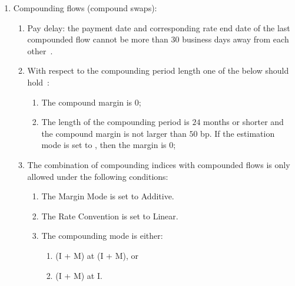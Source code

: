 \documentclass[]{pmv_report} %
\begin{document}
\begin{enumerate}
\begin{enumerate}
              For pricing-purposes the mean type `built on a weighting schedule’ is allowed to be used, provided the difference between the schedule period lengths of the weighting schedule and the fixing schedule used in the average index for the curve calibration is no more than 10 calendar days.
              This limitation is imposed to bound the error due to neglecting convexity adjustments.
          \item The approximation methods (the first order  and the second order) for the average rates are not requested and as such are not signed off~\cite{MxSettings.StaticData-RateIndex}.
          \item Murex does not recommend to use \textit{Rate conversion} in combination with Average index (see Murex documentation~\cite{Mx.RateIndex})~\cite{MxSettings.IRS,MxSettings.IRSGenerator}.
      \end{enumerate}
  \item Compounding flows (compound swaps):
  \begin{enumerate}
    \item Pay delay: the payment date and corresponding rate end date of the last compounded flow cannot be more than 30 business days away from each other~\cite{MxSettings.IRS}.
    \item With respect to the compounding period length one of the below should hold~\cite{MxSettings.IRS}:
    \begin{enumerate}
      \item The compound margin is $0$;
      \item The length of the compounding period is $24$ months or shorter and the compound margin is not larger than $50$ bp.
            If the estimation mode is set to , then the margin is $0$;
    \end{enumerate}
    \item The combination of compounding indices with compounded flows is only allowed under the following conditions:
    \begin{enumerate}
      \item The Margin Mode is set to Additive.
      \item The Rate Convention is set to Linear.
      \item The compounding mode is either:
        \begin{enumerate}
          \item (I + M) at (I + M), or
          \item (I + M) at I.

\end{enumerate}
\end{enumerate}
\end{enumerate}
\end{enumerate}
\end{document}
